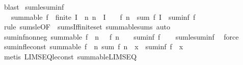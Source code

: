 \begin{isabellebody}
\ blast%
\endisatagproof
{\isafoldproof}%
%
\isadelimproof
\isanewline
%
\endisadelimproof
\isanewline
{}\isamarkupfalse%
\ sum{\isacharunderscore}{\kern0pt}le{\isacharunderscore}{\kern0pt}suminf{\isacharcolon}{\kern0pt}\isanewline
\ \ \ {\isachardoublequoteopen}summable\ f\ {\isasymLongrightarrow}\ finite\ I\ {\isasymLongrightarrow}\ {\isacharparenleft}{\kern0pt}{\isasymAnd}n{\isachardot}{\kern0pt}\ n\ {\isasymin}{\isacharminus}{\kern0pt}\ I\ {\isasymLongrightarrow}\ {}\ {\isasymle}\ f\ n{\isacharparenright}{\kern0pt}\ {\isasymLongrightarrow}\ sum\ f\ I\ {\isasymle}\ suminf\ f{\isachardoublequoteclose}\isanewline
%
\isadelimproof
\ \ %
\endisadelimproof
%
\isatagproof
{}\isamarkupfalse%
\ {\isacharparenleft}{\kern0pt}rule\ sums{\isacharunderscore}{\kern0pt}le{\isacharbrackleft}{\kern0pt}OF\ {\isacharunderscore}{\kern0pt}\ sums{\isacharunderscore}{\kern0pt}If{\isacharunderscore}{\kern0pt}finite{\isacharunderscore}{\kern0pt}set\ summable{\isacharunderscore}{\kern0pt}sums{\isacharbrackright}{\kern0pt}{\isacharparenright}{\kern0pt}\ auto%
\endisatagproof
{\isafoldproof}%
%
\isadelimproof
\isanewline
%
\endisadelimproof
\isanewline
{}\isamarkupfalse%
\ suminf{\isacharunderscore}{\kern0pt}nonneg{\isacharcolon}{\kern0pt}\ {\isachardoublequoteopen}summable\ f\ {\isasymLongrightarrow}\ {\isacharparenleft}{\kern0pt}{\isasymAnd}n{\isachardot}{\kern0pt}\ {}\ {\isasymle}\ f\ n{\isacharparenright}{\kern0pt}\ {\isasymLongrightarrow}\ {}\ {\isasymle}\ suminf\ f{\isachardoublequoteclose}\isanewline
%
\isadelimproof
\ \ %
\endisadelimproof
%
\isatagproof
{}\isamarkupfalse%
\ sum{\isacharunderscore}{\kern0pt}le{\isacharunderscore}{\kern0pt}suminf\ \isamarkupfalse%
\ force%
\endisatagproof
{\isafoldproof}%
%
\isadelimproof
\isanewline
%
\endisadelimproof
\isanewline
{}\isamarkupfalse%
\ suminf{\isacharunderscore}{\kern0pt}le{\isacharunderscore}{\kern0pt}const{\isacharcolon}{\kern0pt}\ {\isachardoublequoteopen}summable\ f\ {\isasymLongrightarrow}\ {\isacharparenleft}{\kern0pt}{\isasymAnd}n{\isachardot}{\kern0pt}\ sum\ f\ {\isacharbraceleft}{\kern0pt}{\isachardot}{\kern0pt}{\isachardot}{\kern0pt}{\isacharless}{\kern0pt}n{\isacharbraceright}{\kern0pt}\ {\isasymle}\ x{\isacharparenright}{\kern0pt}\ {\isasymLongrightarrow}\ suminf\ f\ {\isasymle}\ x{\isachardoublequoteclose}\isanewline
%
\isadelimproof
\ \ %
\endisadelimproof
%
\isatagproof
{}\isamarkupfalse%
\ {\isacharparenleft}{\kern0pt}metis\ LIMSEQ{\isacharunderscore}{\kern0pt}le{\isacharunderscore}{\kern0pt}const{}\ summable{\isacharunderscore}{\kern0pt}LIMSEQ{\isacharparenright}{\kern0pt}%

\end{isabellebody}
